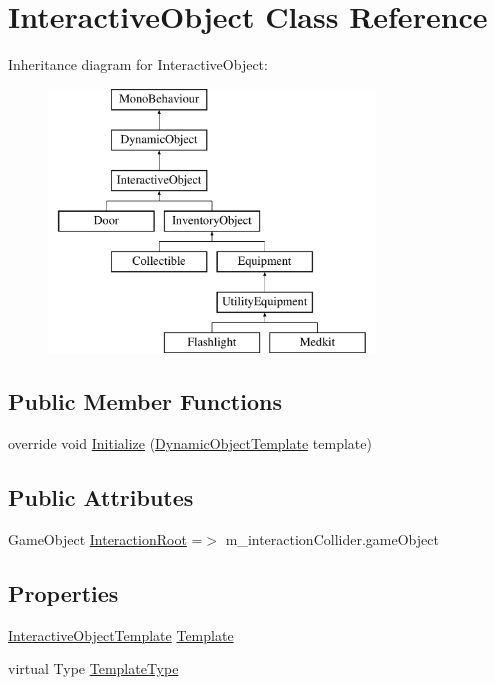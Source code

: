 \hypertarget{class_interactive_object}{}\section{Interactive\+Object Class Reference}
\label{class_interactive_object}
Inheritance diagram for Interactive\+Object\+:\begin{figure}[H]
\begin{center}
\leavevmode
\includegraphics[height=7.000000cm]{class_interactive_object}
\end{center}
\end{figure}
\subsection*{Public Member Functions}
\begin{DoxyCompactItemize}
\item 
override void \mbox{\hyperlink{class_interactive_object_a6337da87a5251d5eb65dccb7f1f76d16}{Initialize}} (\mbox{\hyperlink{class_dynamic_object_template}{Dynamic\+Object\+Template}} template)
\end{DoxyCompactItemize}
\subsection*{Public Attributes}
\begin{DoxyCompactItemize}
\item 
Game\+Object \mbox{\hyperlink{class_interactive_object_ad4fa46cffeb6343827cac2e45324c443}{Interaction\+Root}} =$>$ m\+\_\+interaction\+Collider.\+game\+Object
\end{DoxyCompactItemize}
\subsection*{Properties}
\begin{DoxyCompactItemize}
\item 
\mbox{\hyperlink{class_interactive_object_template}{Interactive\+Object\+Template}} \mbox{\hyperlink{class_interactive_object_a485ad8d7ce23aef73e8ed4845df0d2a5}{Template}}
\item 
virtual Type \mbox{\hyperlink{class_interactive_object_ac2ffa10be1d62f9fd172e39ebf0ae87d}{Template\+Type}}
\end{DoxyCompactItemize}



